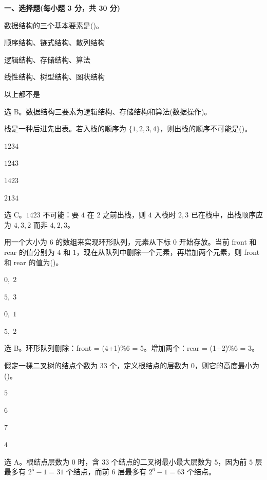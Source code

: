 \textbf{一、选择题(每小题 3 分，共 30 分)}

\begin{question}
数据结构的三个基本要素是(\quad)。
\begin{choiceoptions}[2]
  \item 顺序结构、链式结构、散列结构
  \item 逻辑结构、存储结构、算法
  \item 线性结构、树型结构、图状结构
  \item 以上都不是
\end{choiceoptions}
\begin{solution}
选 B。数据结构三要素为逻辑结构、存储结构和算法(数据操作)。
\end{solution}
\end{question}

\begin{question}
栈是一种后进先出表。若入栈的顺序为 $\{1,2,3,4\}$，则出栈的顺序不可能是(\quad)。
\begin{choiceoptions}[2]
  \item $1234$
  \item $1243$
  \item $1423$
  \item $2134$
\end{choiceoptions}
\begin{solution}
选 C。$1423$ 不可能：要 $4$ 在 $2$ 之前出栈，则 $4$ 入栈时 $2,3$ 已在栈中，出栈顺序应为 $4,3,2$ 而非 $4,2,3$。
\end{solution}
\end{question}

\begin{question}
用一个大小为 $6$ 的数组来实现环形队列，元素从下标 $0$ 开始存放。当前 front 和 rear 的值分别为 $4$ 和 $1$，现在从队列中删除一个元素，再增加两个元素，则 front 和 rear 的值为(\quad)。
\begin{choiceoptions}[1]
  \item $0,\;2$
  \item $5,\;3$
  \item $0,\;1$
  \item $5,\;2$
\end{choiceoptions}
\begin{solution}
选 B。环形队列删除：front = (4+1)\%6 = 5。增加两个：rear = (1+2)\%6 = 3。
\end{solution}
\end{question}

\begin{question}
假定一棵二叉树的结点个数为 $33$ 个，定义根结点的层数为 $0$，则它的高度最小为(\quad)。
\begin{choiceoptions}[2]
  \item $5$
  \item $6$
  \item $7$
  \item $4$
\end{choiceoptions}
\begin{solution}
选 A。根结点层数为 $0$ 时，含 $33$ 个结点的二叉树最小最大层数为 $5$，因为前 $5$ 层最多有 $2^5-1=31$ 个结点，而前 $6$ 层最多有 $2^6-1=63$ 个结点。
\end{solution}
\end{question}

